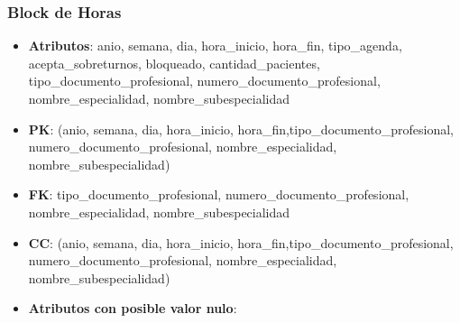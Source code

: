 \documentclass[a4paper,11pt]{article}
\begin{document}
\subsubsection{\textbf{Block de Horas}}

\begin{itemize}

\item 
\textbf{Atributos}:  anio, semana, dia, hora\_inicio, hora\_fin, tipo\_agenda, acepta\_sobreturnos,  bloqueado, cantidad\_pacientes, tipo\_documento\_profesional, numero\_documento\_profesional, nombre\_especialidad, nombre\_subespecialidad

\item 
\textbf{PK}: (anio, semana, dia, hora\_inicio, hora\_fin,tipo\_documento\_profesional, numero\_documento\_profesional, nombre\_especialidad, nombre\_subespecialidad)

\item
\textbf{FK}:  tipo\_documento\_profesional, numero\_documento\_profesional, nombre\_especialidad, nombre\_subespecialidad

\item 
\textbf{CC}: (anio, semana, dia, hora\_inicio, hora\_fin,tipo\_documento\_profesional, numero\_documento\_profesional, nombre\_especialidad, nombre\_subespecialidad)

\item 
\textbf{Atributos con posible valor nulo}:

\end{itemize}
\end{document}
